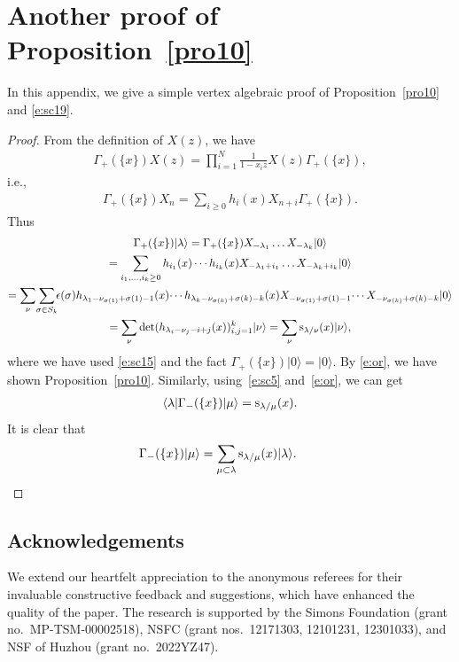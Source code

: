 \documentclass[10pt,a4paper]{amsart}
\numberwithin{equation}{section}
\begin{document}
\section{Another proof of Proposition~\ref{pro10}}\label{appA}
In this appendix, we give a simple vertex algebraic proof of Proposition~\ref{pro10} and \eqref{e:sc19}.
\begin{proof}
From the definition of $X(z)$, we have
\begin{align*}
\Gamma_+(\{x\})X(z)=\prod^N_{i=1}\frac{1}{1-x_iz}X(z)\Gamma_+(\{x\}),
\end{align*}
i.e.,
\begin{align*}
\Gamma_+(\{x\})X_n=\sum_{i\geq 0}h_i(x)X_{n+i}\Gamma_+(\{x\}).
\end{align*}
Thus
\begin{gather*}
\Gamma_+(\{x\})|\lambda\rangle
 =\Gamma_+(\{x\})X_{-\lambda_1}\dots X_{-\lambda_k}|0\rangle\\
 =\sum_{i_1,\dots,i_k\geq 0}h_{i_1}(x)\cdots h_{i_k}(x)X_{-\lambda_1+i_1}\dots X_{-\lambda_k+i_k}|0\rangle
\\
= \sum_{\nu}\!\sum_{\sigma\in S_k}\!\!\epsilon(\sigma)h_{\lambda_1-\nu_{\sigma(1)}+\sigma(1)-1}(x)\!\cdots h_{\lambda_k-\nu_{\sigma(k)}+\sigma(k)-k}(x)X_{-\nu_{\sigma(1)}+\sigma(1)-1}\!\cdots X_{-\nu_{\sigma(k)}+\sigma(k)-k}|0\rangle\\
= \sum_{\nu}\det(h_{\lambda_i-\nu_j-i+j}(x))^k_{i,j=1}|\nu\rangle = \sum_{\nu}{\rm s}_{\lambda/\nu}(x)|\nu\rangle,
\end{gather*}
where we have used \eqref{e:sc15} and the fact $\Gamma_+(\{x\})|0\rangle=|0\rangle$. By \eqref{e:or}, we have shown Proposition~\ref{pro10}. Similarly, using~\eqref{e:sc5} and~\eqref{e:or}, we can get
\begin{align*}
\langle\lambda|\Gamma_-(\{x\})|\mu\rangle = {\rm s}_{\lambda/\mu}(x).
\end{align*}
It is clear that
\begin{align*}
\Gamma_-(\{x\})|\mu\rangle = \sum_{\mu\subset \lambda}{\rm s}_{\lambda/\mu}(x)|\lambda\rangle.\tag*{\qed}
\end{align*}\renewcommand{\qed}{}
\end{proof}

\subsection*{Acknowledgements}

We extend our heartfelt appreciation to the anonymous referees for their invaluable constructive feedback and suggestions, which have enhanced the quality of the paper.
The research is supported by the Simons Foundation (grant no.\ MP-TSM-00002518), NSFC (grant nos.\ 12171303, 12101231, 12301033), and NSF of Huzhou (grant no.\ 2022YZ47).
\end{document}
